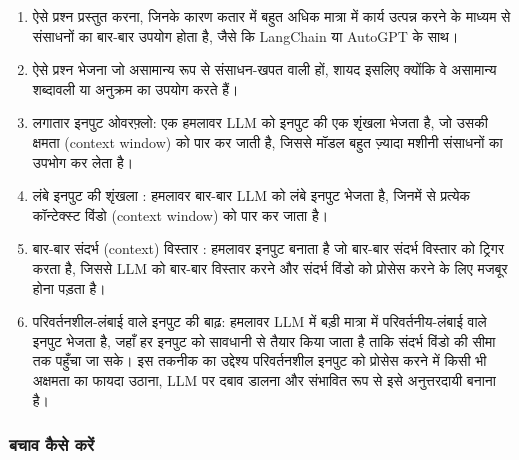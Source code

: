 \documentclass[
]{article}
\providecommand{\tightlist}{%
  \setlength{\itemsep}{0pt}\setlength{\parskip}{0pt}}
\begin{document}
\begin{enumerate}
\def\labelenumi{\arabic{enumi}.}
\tightlist
\item
  ऐसे प्रश्न प्रस्तुत करना, जिनके कारण कतार में बहुत अधिक मात्रा में कार्य उत्पन्न करने के
  माध्यम से संसाधनों का बार-बार उपयोग होता है, जैसे कि LangChain या AutoGPT के
  साथ।
\item
  ऐसे प्रश्न भेजना जो असामान्य रूप से संसाधन-खपत वाली हों, शायद इसलिए क्योंकि वे
  असामान्य शब्दावली या अनुक्रम का उपयोग करते हैं।
\item
  लगातार इनपुट ओवरफ़्लो: एक हमलावर LLM को इनपुट की एक शृंखला भेजता है, जो उसकी
  क्षमता (context window) को पार कर जाती है, जिससे मॉडल बहुत ज़्यादा मशीनी
  संसाधनों का उपभोग कर लेता है।
\item
  लंबे इनपुट की शृंखला : हमलावर बार-बार LLM को लंबे इनपुट भेजता है, जिनमें से प्रत्येक
  कॉन्टेक्स्ट विंडो (context window) को पार कर जाता है।
\item
  बार-बार संदर्भ (context) विस्तार : हमलावर इनपुट बनाता है जो बार-बार संदर्भ
  विस्तार को ट्रिगर करता है, जिससे LLM को बार-बार विस्तार करने और संदर्भ विंडो को
  प्रोसेस करने के लिए मजबूर होना पड़ता है।
\item
  परिवर्तनशील-लंबाई वाले इनपुट की बाढ़: हमलावर LLM में बड़ी मात्रा में
  परिवर्तनीय-लंबाई वाले इनपुट भेजता है, जहाँ हर इनपुट को सावधानी से तैयार किया
  जाता है ताकि संदर्भ विंडो की सीमा तक पहुँचा जा सके। इस तकनीक का उद्देश्य
  परिवर्तनशील इनपुट को प्रोसेस करने में किसी भी अक्षमता का फायदा उठाना, LLM पर
  दबाव डालना और संभावित रूप से इसे अनुत्तरदायी बनाना है।
\end{enumerate}

\subsubsection{बचाव कैसे करें}\label{ux92cux91aux935-ux915ux938-ux915ux930}
\end{document}
